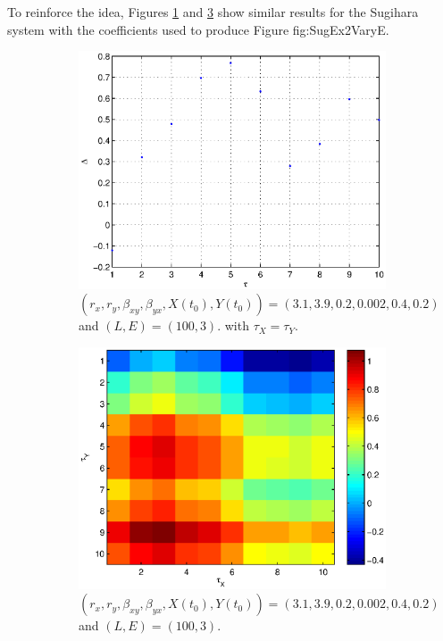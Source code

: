\documentclass[a4paper,11pt]{article}
\begin{document}
To reinforce the idea, Figures \ref{fig:SugEx2vTauXY} and \ref{fig:SugEx2vTauXvTauY} show similar results for the Sugihara system with the coefficients used to produce Figure {fig:SugEx2VaryE}.
\begin{figure}[h!t]
\centering
\begin{subfigure}[b]{0.4\textwidth}
\label{fig:SugEx2vTauXY}
\includegraphics[scale=0.55]{graphics/SugEx2vTauXY.eps}
\caption{ $\left(r_x,r_y,\beta_{xy},\beta_{yx},X(t_0),Y(t_0)\right) = \left(3.1,3.9,0.2,0.002,0.4,0.2\right)$ and $\left(L,E\right) = \left(100,3\right)$. with $\tau_X=\tau_Y$.}
\end{subfigure}
\begin{subfigure}[b]{0.4\textwidth}
\label{fig:SugEx2vTauXvTauY}
\includegraphics[scale=0.55]{graphics/SugEx2vTauXvTauY.eps}
\caption{ $\left(r_x,r_y,\beta_{xy},\beta_{yx},X(t_0),Y(t_0)\right) = \left(3.1,3.9,0.2,0.002,0.4,0.2\right)$ and $\left(L,E\right) = \left(100,3\right)$.}
\end{subfigure}
\caption{}
\end{figure}
\end{document}
